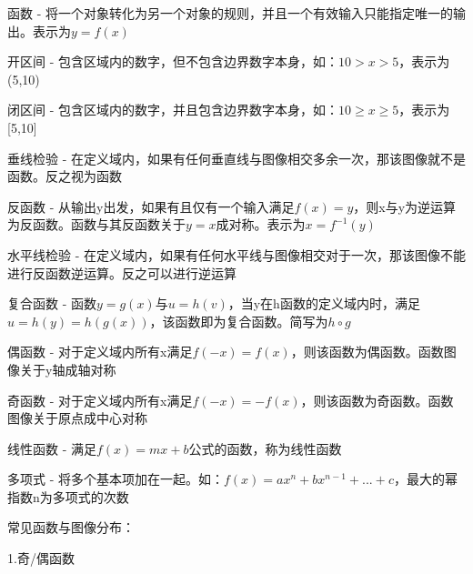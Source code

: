\documentclass[UTF8,fontset=ubuntu]{ctexart}
\begin{document}
函数 - 将一个对象转化为另一个对象的规则，并且一个有效输入只能指定唯一的输出。表示为$y=f(x)$\par
开区间 - 包含区域内的数字，但不包含边界数字本身，如：$10 > x > 5$，表示为(5,10)\par
闭区间 - 包含区域内的数字，并且包含边界数字本身，如：$10 \geq x \geq 5$，表示为[5,10]\par
垂线检验 - 在定义域内，如果有任何垂直线与图像相交多余一次，那该图像就不是函数。反之视为函数\par
反函数 - 从输出y出发，如果有且仅有一个输入满足$f(x)=y$，则x与y为逆运算为反函数。函数与其反函数关于$y=x$成对称。表示为$x=f^{-1}(y)$\par
水平线检验 - 在定义域内，如果有任何水平线与图像相交对于一次，那该图像不能进行反函数逆运算。反之可以进行逆运算\par
复合函数 - 函数$y=g(x)$与$u=h(v)$，当y在h函数的定义域内时，满足$u=h(y)=h(g(x))$，该函数即为复合函数。简写为$h \circ g$\par
偶函数 - 对于定义域内所有x满足$f(-x)=f(x)$，则该函数为偶函数。函数图像关于y轴成轴对称\par
奇函数 - 对于定义域内所有x满足$f(-x)=-f(x)$，则该函数为奇函数。函数图像关于原点成中心对称\par
线性函数 - 满足$f(x)=mx+b$公式的函数，称为线性函数\par
多项式 - 将多个基本项加在一起。如：$f(x)=ax^n+bx^{n-1}+...+c$，最大的幂指数n为多项式的次数\par
常见函数与图像分布：\par
1.奇/偶函数
\begin{figure}[H]
\end{figure}
\end{document}
